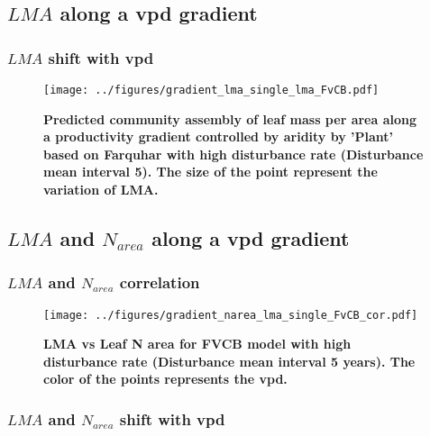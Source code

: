 \documentclass[a4paper,11pt]{article}
\begin{document}
\subsection{$LMA$ along a vpd gradient}


\subsubsection{$LMA$  shift with vpd}

\begin{figure}[ht]
\centering
\texttt{[image: ../figures/gradient\_lma\_single\_lma\_FvCB.pdf]}
\caption{\textbf{Predicted community assembly of leaf mass per area along a productivity gradient controlled by aridity by 'Plant' based on Farquhar with high disturbance rate (Disturbance mean interval 5). The size of the point represent the variation of LMA.}
\label{fig:lma_vpd}}
\end{figure}

\clearpage

\subsection{$LMA$ and $N_{area}$ along a vpd gradient}
\subsubsection{$LMA$ and $N_{area}$ correlation}

\begin{figure}[ht]
\centering
\texttt{[image: ../figures/gradient\_narea\_lma\_single\_FvCB\_cor.pdf]}
\caption{\textbf{LMA vs Leaf N area for FVCB model with high disturbance rate (Disturbance mean interval 5 years). The color of the points represents the vpd.}
\label{fig:lma_narea_cor_single}}
\end{figure}


\clearpage

\subsubsection{$LMA$ and $N_{area}$ shift with vpd}


\end{document}
